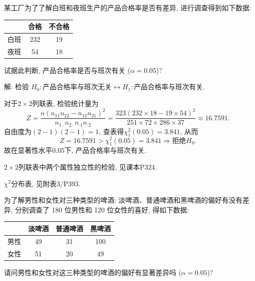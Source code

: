 \documentclass[standard]{ExBook}
\renewenvironment{shaded}{%
  \def\FrameCommand{\fboxsep=\FrameSep \colorbox{shadecolor}}%
  \MakeFramed{\advance\hsize-\width \FrameRestore}%
}{%
  \endMakeFramed
}
\begin{document}
\begin{qitems}
    \begin{bbox}
    \begin{shaded}
        \qitem
某工厂为了了解白班和夜班生产的产品合格率是否有差异, 进行调查得到如下数据:
\begin{center}
\setlength{\tabcolsep}{63pt}
\begin{tabular}{c|c|c}
\hline
 & 合格 & 不合格 \\
\hline
白班 & 232 & 19 \\
夜班 & 54 & 18 \\
\hline
\end{tabular}
\end{center}
试据此判断, 产品合格率是否与班次有关 ($\alpha=0.05$)?
    \end{shaded}
    \end{bbox}

\vspace{\dimexpr2.5cm-5em\relax}

解: 检验
$
H_0:\text{产品合格率与班次无关}
\leftrightarrow
H_1:\text{产品合格率与班次有关}.
$

对于$2\times2$列联表, 检验统计量为
$$
Z
=\frac{n(n_{11}n_{22}-n_{12}n_{21})^2}
{n_{1\cdot}n_{2\cdot}n_{\cdot1}n_{\cdot2}}
=\frac{323(232\times18-19\times54)^2}
{251\times72\times286\times37}
\approx16.7591.
$$
自由度为$(2-1)(2-1)=1$, 查表得$\chi_1^2(0.05)=3.841$, 从而
$$
Z=16.7591>\chi_1^2(0.05)=3.841
\Longrightarrow
\text{拒绝}H_0.
$$
故在显著性水平$0.05$下, 产品合格率与班次有关.

\textcolor{themeColor}{\selectfont {} $2\times2$列联表中两个属性独立性的检验, 见课本P324.}

\textcolor{themeColor}{\selectfont {} $\chi^2$分布表, 见附表3/P393.}

\vspace{2.5cm-5em}

    \begin{bbox}
    \begin{shaded}
        \qitem
为了解男性和女性对三种类型的啤酒: 淡啤酒、普通啤酒和黑啤酒的偏好有没有差异, 分别调查了 180 位男性和 120 位女性的喜好, 得如下数据:
\begin{center}
\setlength{\tabcolsep}{41pt}
\begin{tabular}{c|c|c|c}
\hline
 & 淡啤酒 & 普通啤酒 & 黑啤酒 \\
\hline
男性 & 49 & 31 & 100 \\
女性 & 51 & 20 & 49 \\
\hline
\end{tabular}
\end{center}
请问男性和女性对这三种类型的啤酒的偏好有显著差异吗 ($\alpha=0.05$)?
    \end{shaded}
    \end{bbox}


\end{qitems}
\end{document}
